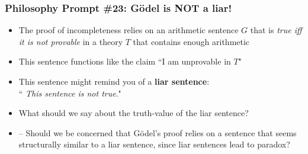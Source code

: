 \begin{frame}
\frametitle{Philosophy Prompt \#23: G\"odel is NOT a liar!}

\begin{itemize}[<+->]

\item The proof of incompleteness relies on an arithmetic sentence $G$ that is \textit{true iff it is not provable} in a theory $T$ that contains enough arithmetic

\item This sentence functions like the claim ``I am unprovable in $T$"

\item This sentence might remind you of a \textbf{liar sentence}:\\ `` \textit{This sentence is not true}."

\item What should we say about the truth-value of the liar sentence? 
\item[] -- Should we be concerned that G\"odel's proof relies on a sentence that seems structurally similar to a liar sentence, since liar sentences lead to paradox?


\end{itemize}
\end{frame}

